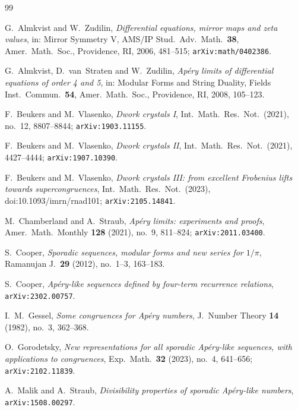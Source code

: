 \documentclass[11pt,reqno]{amsart}
\theoremstyle{plain}
\theoremstyle{definition}
\theoremstyle{remark}
\numberwithin{equation}{section}
\begin{document}
\begin{thebibliography}{99}

G.~Almkvist and W.~Zudilin,
\emph{Differential equations, mirror maps and zeta values},
in: Mirror Symmetry V, AMS/IP Stud.\ Adv.\ Math.\ \textbf{38}, Amer.\ Math.\ Soc.,
Providence, RI, 2006, 481--515; \texttt{arXiv:math/0402386}.

G.~Almkvist, D.~van~Straten and W.~Zudilin,
\emph{Ap\'ery limits of differential equations of order 4 and 5},
in: Modular Forms and String Duality, Fields Inst.\ Commun.\ \textbf{54}, Amer.\ Math.\
Soc., Providence, RI, 2008, 105--123.

F.~Beukers and M.~Vlasenko,
\emph{Dwork crystals I},
Int.\ Math.\ Res.\ Not.\ (2021), no.~12, 8807--8844; \texttt{arXiv:1903.11155}.

F.~Beukers and M.~Vlasenko,
\emph{Dwork crystals II},
Int.\ Math.\ Res.\ Not.\ (2021), 4427--4444; \texttt{arXiv:1907.10390}.

F.~Beukers and M.~Vlasenko,
\emph{Dwork crystals III: from excellent Frobenius lifts towards supercongruences},
Int.\ Math.\ Res.\ Not.\ (2023), doi:10.1093/imrn/rnad101; \texttt{arXiv:2105.14841}.

M.~Chamberland and A.~Straub,
\emph{Ap\'ery limits: experiments and proofs},
Amer.\ Math.\ Monthly \textbf{128} (2021), no.~9, 811--824; \texttt{arXiv:2011.03400}.

S.~Cooper,
\emph{Sporadic sequences, modular forms and new series for $1/\pi$},
Ramanujan J.\ \textbf{29} (2012), no.~1--3, 163--183.

S.~Cooper,
\emph{Ap\'ery-like sequences defined by four-term recurrence relations},
\texttt{arXiv:2302.00757}.

I.~M.~Gessel,
\emph{Some congruences for Ap\'ery numbers},
J.\ Number Theory \textbf{14} (1982), no.~3, 362--368.

O.~Gorodetsky,
\emph{New representations for all sporadic Ap\'ery-like sequences, with applications to
congruences},
Exp.\ Math.\ \textbf{32} (2023), no.~4, 641--656; \texttt{arXiv:2102.11839}.

A.~Malik and A.~Straub,
\emph{Divisibility properties of sporadic Ap\'ery-like numbers},
\texttt{arXiv:1508.00297}.


\end{thebibliography}
\end{document}
